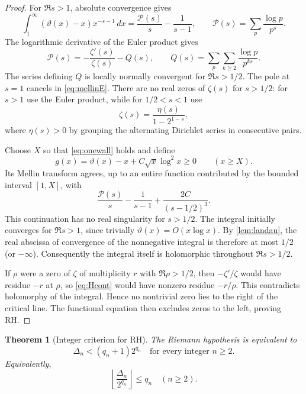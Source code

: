 \documentclass[10pt]{article}
\newtheorem{theorem}{Theorem}[section]
\theoremstyle{definition}
\newcommand{\tht}{\vartheta}
\begin{document}
\begin{proof}
For $\Re s>1$, absolute convergence gives
\begin{equation}
\label{eq:mellinE}
\int_1^\infty (\tht(x)-x)x^{-s-1}\,dx
=\frac{\mathcal P(s)}s-\frac1{s-1},
\qquad
\mathcal P(s)=\sum_p\frac{\log p}{p^s}.
\end{equation}
The logarithmic derivative of the Euler product gives
\[
\mathcal P(s)=-\frac{\zeta'(s)}{\zeta(s)}-Q(s),
\qquad
Q(s)=\sum_p\sum_{k\ge2}\frac{\log p}{p^{ks}}.
\]
The series defining $Q$ is locally normally convergent for $\Re s>1/2$. The
pole at $s=1$ cancels in \eqref{eq:mellinE}. There are no real zeros of
$\zeta(s)$ for $s>1/2$: for $s>1$ use the Euler product, while for $1/2<s<1$
use
\[
\zeta(s)=\frac{\eta(s)}{1-2^{1-s}},
\]
where $\eta(s)>0$ by grouping the alternating Dirichlet series in consecutive
pairs.

Choose $X$ so that \eqref{eq:onewall} holds and define
\[
g(x)=\tht(x)-x+C\sqrt x\log^2x\ge0\qquad(x\ge X).
\]
Its Mellin transform agrees, up to an entire function contributed by the
bounded interval $[1,X]$, with
\begin{equation}
\label{eq:Hcont}
\frac{\mathcal P(s)}s-\frac1{s-1}+\frac{2C}{(s-1/2)^3}.
\end{equation}
This continuation has no real singularity for $s>1/2$. The integral initially
converges for $\Re s>1$, since trivially $\tht(x)=O(x\log x)$. By
\cref{lem:landau}, the real abscissa of convergence of the nonnegative
integral is therefore at most $1/2$ (or $-\infty$). Consequently the integral
itself is holomorphic throughout $\Re s>1/2$.

If $\rho$ were a zero of $\zeta$ of multiplicity $r$ with $\Re\rho>1/2$, then
$-\zeta'/\zeta$ would have residue $-r$ at $\rho$, so \eqref{eq:Hcont} would
have nonzero residue $-r/\rho$. This contradicts holomorphy of the integral.
Hence no nontrivial zero lies to the right of the critical line. The
functional equation then excludes zeros to the left, proving RH.
\end{proof}

\begin{theorem}[Integer criterion for RH]
\label{thm:criterion}
The Riemann hypothesis is equivalent to
\begin{equation}
\label{eq:criterion2}
\Delta_n<(q_n+1)2^{q_n}\quad\text{for every integer }n\ge2.
\end{equation}
Equivalently,
\[
\left\lfloor\frac{\Delta_n}{2^{q_n}}\right\rfloor\le q_n
\quad(n\ge2).
\]
\end{theorem}
\end{document}
